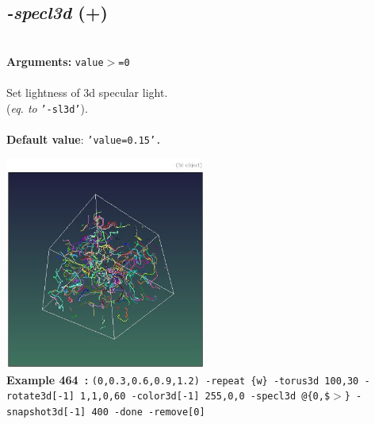 \documentclass[a4paper,11pt,twoside]{book}
\begin{document}
\subsection{\emph{-specl3d} (+)}\vspace*{-0.5em}
~\\\textbf{Arguments: } 
{\small \texttt{value$>$=0}}\\~\\
Set lightness of 3d specular light.
~\\(\emph{eq. to} {\small \texttt{'-sl3d'}}).
~\\~\\\textbf{Default value}: {\small \texttt{'value=0.15'.}}
\begin{center}\includegraphics[keepaspectratio=true,height=7cm,width=\textwidth]{img/gmic_def464.jpg}\\
{\footnotesize \textbf{Example 464~:} \texttt{(0,0.3,0.6,0.9,1.2) -repeat \{w\} -torus3d 100,30 -rotate3d[-1] 1,1,0,60 -color3d[-1] 255,0,0 -specl3d @\{0,\$$>$\} -snapshot3d[-1] 400 -done -remove[0]}}
\end{center}
\end{document}
